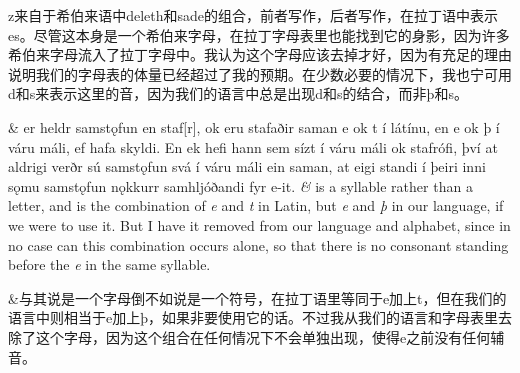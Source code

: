 \begin{translation*}{}
    z来自于希伯来语中deleth和sade的组合，前者写作，后者写作，在拉丁语中表示es。尽管这本身是一个希伯来字母，在拉丁字母表里也能找到它的身影，因为许多希伯来字母流入了拉丁字母中。我认为这个字母应该去掉才好，因为有充足的理由说明我们的字母表的体量已经超过了我的预期。在少数必要的情况下，我也宁可用d和s来表示这里的音，因为我们的语言中总是出现d和s的结合，而非þ和s。
\end{translation*}

\begin{paracol}{2}
    \& er heldr samstǫfun en staf[r], ok eru stafaðir saman e ok t í látínu, en e ok þ í váru máli, ef hafa skyldi. En ek hefi hann sem sízt í váru máli ok stafrófi, því at aldrigi verðr sú samstǫfun svá í váru máli ein saman, at eigi standi í þeiri inni sǫmu samstǫfun nǫkkurr samhljóðandi fyr e-it.
    \switchcolumn
    \textit{\&} is a syllable rather than a letter, and is the combination of \textit{e} and \textit{t} in Latin, but \textit{e} and \textit{þ} in our language, if we were to use it. But I have it removed from our language and alphabet, since in no case can this combination occurs alone, so that there is no consonant standing before the \textit{e} in the same syllable.
\end{paracol}
\begin{translation*}{}
    \&与其说是一个字母倒不如说是一个符号，在拉丁语里等同于e加上t，但在我们的语言中则相当于e加上þ，如果非要使用它的话。不过我从我们的语言和字母表里去除了这个字母，因为这个组合在任何情况下不会单独出现，使得e之前没有任何辅音。
\end{translation*}

